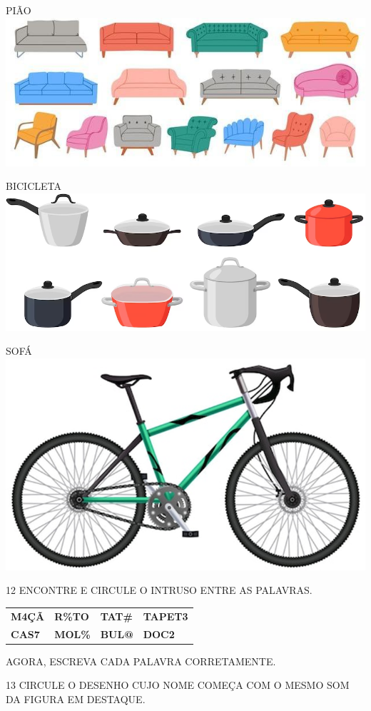 PIÃO \hfill\includegraphics[width=.4\textwidth]{media/image45.jpg}

BICICLETA \hfill\includegraphics[width=.4\textwidth]{media/image46.png}

SOFÁ \hfill\includegraphics[width=.3\textwidth]{media/image48.png}

\num{12} ENCONTRE E CIRCULE O INTRUSO ENTRE AS PALAVRAS.

\begin{longtable}[]{@{}llll@{}}
\toprule
\textbf{M4ÇÃ} & \textbf{R\%TO} & \textbf{TAT\#} &
\textbf{TAPET3}\tabularnewline
\textbf{CAS7} & \textbf{MOL\%} & \textbf{BUL@} &
\textbf{DOC2}\tabularnewline
\bottomrule
\end{longtable}

AGORA, ESCREVA CADA PALAVRA CORRETAMENTE.


\num{13} CIRCULE O DESENHO CUJO NOME COMEÇA COM O MESMO SOM DA FIGURA EM DESTAQUE.


